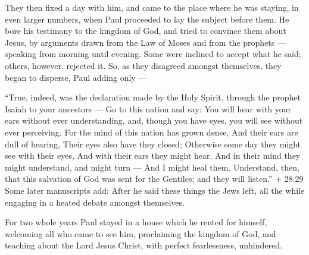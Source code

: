  They then fixed a day with him, and came to the place
where he was staying, in even larger numbers, when Paul proceeded to lay
the subject before them. He bore his testimony to the kingdom of God,
and tried to convince them about Jesus, by arguments drawn from the Law
of Moses and from the prophets --- speaking from morning until evening.
 Some were inclined to accept what he said; others,
however, rejected it.  So, as they disagreed amongst
themselves, they began to disperse, Paul adding only ---

``True, indeed, was the declaration made by the Holy Spirit, through the
prophet Isaiah to your ancestors ---  Go to this nation and
say: You will hear with your ears without ever understanding, and,
though you have eyes, you will see without ever perceiving.
 For the mind of this nation has grown dense, And their
ears are dull of hearing, Their eyes also have they closed; Otherwise
some day they might see with their eyes, And with their ears they might
hear, And in their mind they might understand, and might turn --- And I
might heal them.  Understand, then, that this salvation of
God was sent for the Gentiles; and they will listen.''  +
28.29 Some later manuscripts add: After he said these things the Jews
left, all the while engaging in a heated debate amongst themselves.

 For two whole years Paul stayed in a house which he rented
for himself, welcoming all who came to see him, 
proclaiming the kingdom of God, and teaching about the Lord Jesus
Christ, with perfect fearlessness, unhindered.
